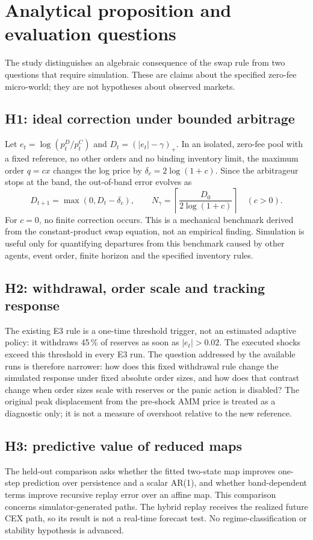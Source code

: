 \chapter{Analytical proposition and evaluation questions}
\label{cap:hipotesis}

The study distinguishes an algebraic consequence of the swap rule from two questions that require simulation. These are claims about the specified zero-fee micro-world; they are not hypotheses about observed markets.

\section{H1: ideal correction under bounded arbitrage}

Let $e_t=\log(p_t^D/p_t^C)$ and $D_t=(|e_t|-\gamma)_+$. In an isolated, zero-fee pool with a fixed reference, no other orders and no binding inventory limit, the maximum order $q=cx$ changes the log price by $\delta_c=2\log(1+c)$. Since the arbitrageur stops at the band, the out-of-band error evolves as
\[
  D_{t+1}=\max(0,D_t-\delta_c),\qquad
  N_\gamma=\left\lceil\frac{D_0}{2\log(1+c)}\right\rceil \quad(c>0).
\]
For $c=0$, no finite correction occurs. This is a mechanical benchmark derived from the constant-product swap equation, not an empirical finding. Simulation is useful only for quantifying departures from this benchmark caused by other agents, event order, finite horizon and the specified inventory rules.

\section{H2: withdrawal, order scale and tracking response}

The existing E3 rule is a one-time threshold trigger, not an estimated adaptive policy: it withdraws 45\,\% of reserves as soon as $|e_t|>0.02$. The executed shocks exceed this threshold in every E3 run. The question addressed by the available runs is therefore narrower: how does this fixed withdrawal rule change the simulated response under fixed absolute order sizes, and how does that contrast change when order sizes scale with reserves or the panic action is disabled? The original peak displacement from the pre-shock AMM price is treated as a diagnostic only; it is not a measure of overshoot relative to the new reference.

\section{H3: predictive value of reduced maps}

The held-out comparison asks whether the fitted two-state map improves one-step prediction over persistence and a scalar AR(1), and whether band-dependent terms improve recursive replay error over an affine map. This comparison concerns simulator-generated paths. The hybrid replay receives the realized future CEX path, so its result is not a real-time forecast test. No regime-classification or stability hypothesis is advanced.

